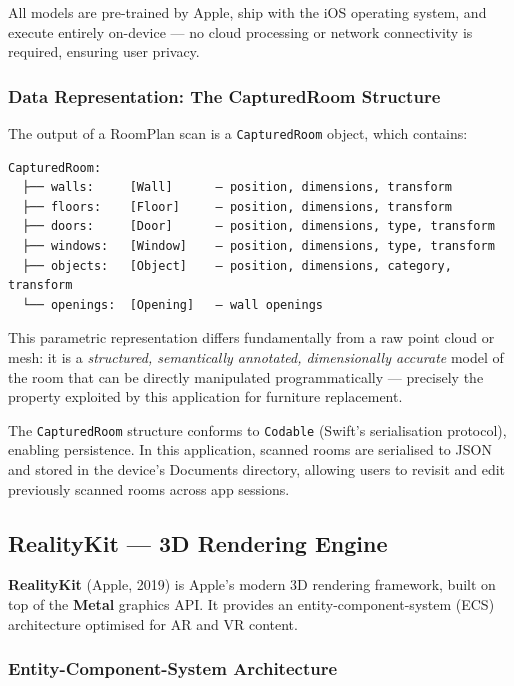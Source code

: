 All models are pre-trained by Apple, ship with the iOS operating system, and execute entirely on-device — no cloud processing or network connectivity is required, ensuring user privacy.

\subsubsection{Data Representation: The CapturedRoom Structure}

The output of a RoomPlan scan is a \texttt{CapturedRoom} object, which contains:

\begin{verbatim}
CapturedRoom:
  ├── walls:     [Wall]      — position, dimensions, transform
  ├── floors:    [Floor]     — position, dimensions, transform
  ├── doors:     [Door]      — position, dimensions, type, transform
  ├── windows:   [Window]    — position, dimensions, type, transform
  ├── objects:   [Object]    — position, dimensions, category, transform
  └── openings:  [Opening]   — wall openings
\end{verbatim}

This parametric representation differs fundamentally from a raw point cloud or mesh: it is a \emph{structured, semantically annotated, dimensionally accurate} model of the room that can be directly manipulated programmatically — precisely the property exploited by this application for furniture replacement.

The \texttt{CapturedRoom} structure conforms to \texttt{Codable} (Swift's serialisation protocol), enabling persistence. In this application, scanned rooms are serialised to JSON and stored in the device's Documents directory, allowing users to revisit and edit previously scanned rooms across app sessions.


\subsection{RealityKit — 3D Rendering Engine}
\label{subsec:realitykit}

\textbf{RealityKit} (Apple, 2019) is Apple's modern 3D rendering framework, built on top of the \textbf{Metal} graphics API. It provides an entity-component-system (ECS) architecture optimised for AR and VR content.

\subsubsection{Entity-Component-System Architecture}

